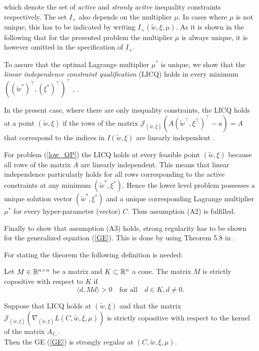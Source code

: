 which denote the set of \emph{active} and \emph{stronly acitve} inequality constraints respectively.
The set \(I_+\) also depends on the multiplier \(\mu\). In cases where \(\mu\) is not unique, this has to be indicated by writing \(I_+(\tilde{w},\xi,\mu)\).  As it is shown in the following that for the presented problem the multiplier \(\mu\) is always unique, it is however omitted in the specification of \(I_+\). 

To assure that the optimal Lagrange multiplier \(\mu^*\) is unique, we show that the \emph{linear independence constraint qualification} (LICQ) holds in every minimum  \(((\tilde{w}^*)^{\top},(\xi^*)^{\top})^{\top}\) \cite[Theorem 4.8, p. 82]{Outrata1998}, \cite[Theorem 1, p. 3]{Wachsmuth2013}.

In the present case, where there are only inequality constraints, the LICQ holds at a point \((\tilde{w},\xi)\) if the rows of the matrix \(\mathcal{J}_{(\tilde{w},\xi)}\left(A(\tilde{w}^{\top},\xi^{\top})^{\top} - a\right) = A\) that correspond to the indices in \(I(\tilde{w},\xi)\) are linearly independent \cite[p. 82, 96]{Outrata1998}.

For problem (\ref{low_QP}) the LICQ holds at every feasible point \((\tilde{w},\xi)\) because all rows of the matrix \(A\) are linearly independent. This means that linear independence particularly holds for all rows corresponding to the active constraints at any minimum \((\tilde{w}^*,\xi^*)\).
Hence the lower level problem possesses a unique solution vector \((\tilde{w}^*,\xi^*)\) and a unique corresponding Lagrange multiplier \(\mu^*\) for every hyper-parameter (vector) \(C\). Thus assumption (A2) is fulfilled.


Finally to show that assumption (A3) holds, strong regularity has to be shown for the generalized equation (\ref{GE}).
This is done by using Theorem 5.8 in \cite[p. 96]{Outrata1998}.

For stating the theorem the following definition is needed:
\begin{definition}
	Let \(M \in \mathbb{R}^{n\times n}\) be a matrix and \(K \subset \mathbb{R}^n\) a cone. The matrix \(M\) is strictly copositive with respect to \(K\) if 
	\[ \langle d,Md \rangle > 0 \quad \text{for all} \quad d \in K, d\neq 0. \]
\end{definition}

\begin{theorem}
	Suppose that LICQ holds at \((\tilde{w},\xi)\) and that the matrix \(\mathcal{J}_{(\tilde{w},\xi)}\left(\nabla_{(\tilde{w},\xi)}L(C,\tilde{w},\xi,\mu)\right)\) is strictly copositive with respect to the kernel of the matrix \(A_{I_+}\). \\
	Then the GE (\ref{GE}) is strongly regular at \((C,\tilde{w},\xi,\mu)\).
\end{theorem}

